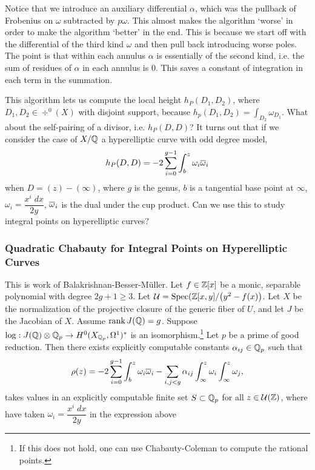 Notice that we introduce an auxiliary differential $\alpha$, which was the pullback of Frobenius on $\omega$ subtracted by $p\omega$. This almost makes the algorithm `worse' in order to make the algorithm `better' in the end. This is because we start off with the differential of the third kind $\omega$ and then pull back introducing worse poles. The point is that within each annulus $\alpha$ is essentially of the second kind, i.e. the sum of residues of $\alpha$ in each annulus is 0. This saves a constant of integration in each term in the summation.  


This algorithm lets us compute the local height $h_P(D_1,D_2)$, where $D_1,D_2 \in \div^0(X)$ with disjoint support, because $h_p(D_1,D_2)= \int_{D_2} \omega_{D_1}$. What about the self-pairing of a divisor, i.e. $h_P(D,D)$? It turns out that if we consider the case of $X/\mathbb{Q}$ a hyperelliptic curve with odd degree model,
	\[
	h_P(D,D)= -2 \sum_{i=0}^{g-1} \int_b^z \omega_i \overline{\omega}_i
	\]
when $D= (z) - (\infty)$, where $g$ is the genus, $b$ is a tangential base point at $\infty$, $\omega_i= \dfrac{x^i \;dx}{2y}$, $\overline{\omega}_i$ is the dual under the cup product. Can we use this to study integral points on hyperelliptic curves? 



\subsubsection{Quadratic Chabauty for Integral Points on Hyperelliptic Curves}

This is work of Balakrishnan-Besser-M\"uller. Let $f \in \mathbb{Z}[x]$ be a monic, separable polynomial with degree $2g+1 \geq 3$. Let $\mathcal{U}= \operatorname{Spec}(\mathbb{Z}[x,y]/ \big(y^2 - f(x)\big)$. Let $X$ be the normalization of the projective closure of the generic fiber of $U$, and let $J$ be the Jacobian of $X$. Assume $\operatorname{rank} J(\mathbb{Q})= g$. Suppose $\log: J(\mathbb{Q}) \otimes \mathbb{Q}_p \to H^0(X_{\mathbb{Q}_p}, \Omega^1)^*$ is an isomorphism.\footnote{If this does not hold, one can use Chabauty-Coleman to compute the rational points.} Let $p$ be a prime of good reduction. Then there exists explicitly computable constants $\alpha_{ij} \in \mathbb{Q}_p$ such that
	\[
	\rho(z)= -2 \sum_{i=0}^{g-1} \int_b^z \omega_i \overline{\omega}_i - \sum_{i,j<g} \alpha_{ij} \int_\infty^z \omega_i \int_\infty^z \omega_j,
	\]
takes values in an explicitly computable finite set $S \subset \mathbb{Q}_p$ for all $z \in \mathcal{U}(\mathbb{Z})$, where have taken $\omega_i= \dfrac{x^i\;dx}{2y}$ in the expression above


